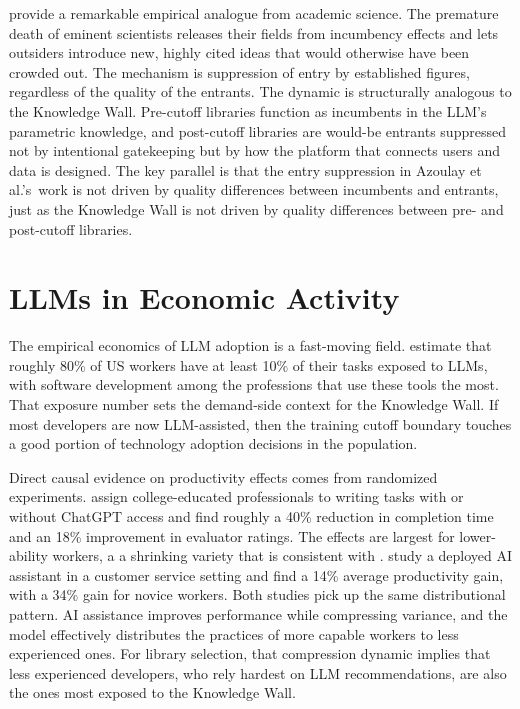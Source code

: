 \documentclass[12pt, a4paper]{report}
\begin{document}
\citet{azoulay2019does} provide a remarkable empirical analogue from academic science. The premature death of eminent scientists releases their fields from incumbency effects and lets outsiders introduce new, highly cited ideas that would otherwise have been crowded out. The mechanism is suppression of entry by established figures, regardless of the quality of the entrants. The dynamic is structurally analogous to the Knowledge Wall. Pre-cutoff libraries function as incumbents in the LLM's parametric knowledge, and post-cutoff libraries are would-be entrants suppressed not by intentional gatekeeping but by how the platform that connects users and data is designed. The key parallel is that the entry suppression in Azoulay et al.'s\ work is not driven by quality differences between incumbents and entrants, just as the Knowledge Wall is not driven by quality differences between pre- and post-cutoff libraries.

\section{LLMs in Economic Activity}\label{sec:lit-productivity}

The empirical economics of LLM adoption is a fast-moving field. \citet{eloundou2024gpts} estimate that roughly 80\% of US workers have at least 10\% of their tasks exposed to LLMs, with software development among the professions that use these tools the most. That exposure number sets the demand-side context for the Knowledge Wall. If most developers are now LLM-assisted, then the training cutoff boundary touches a good portion of technology adoption decisions in the population.

Direct causal evidence on productivity effects comes from randomized experiments. \citet{noy2023experimental} assign college-educated professionals to writing tasks with or without ChatGPT access and find roughly a 40\% reduction in completion time and an 18\% improvement in evaluator ratings. The effects are largest for lower-ability workers, a a shrinking variety that is consistent with \citet{doshi2024generative}. \citet{brynjolfsson2023generative} study a deployed AI assistant in a customer service setting and find a 14\% average productivity gain, with a 34\% gain for novice workers. Both studies pick up the same distributional pattern. AI assistance improves performance while compressing variance, and the model effectively distributes the practices of more capable workers to less experienced ones. For library selection, that compression dynamic implies that less experienced developers, who rely hardest on LLM recommendations, are also the ones most exposed to the Knowledge Wall.
\end{document}
